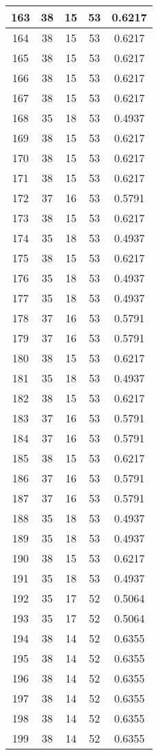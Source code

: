 \documentclass[letterpaper, 12pt]{article}
\begin{document}
\begin{longtable}{|c|c|c|c|c|}
\hline
163 & 38 & 15 & 53 & 0.6217 \\
\hline
164 & 38 & 15 & 53 & 0.6217 \\
\hline
165 & 38 & 15 & 53 & 0.6217 \\
\hline
166 & 38 & 15 & 53 & 0.6217 \\
\hline
167 & 38 & 15 & 53 & 0.6217 \\
\hline
168 & 35 & 18 & 53 & 0.4937 \\
\hline
169 & 38 & 15 & 53 & 0.6217 \\
\hline
170 & 38 & 15 & 53 & 0.6217 \\
\hline
171 & 38 & 15 & 53 & 0.6217 \\
\hline
172 & 37 & 16 & 53 & 0.5791 \\
\hline
173 & 38 & 15 & 53 & 0.6217 \\
\hline
174 & 35 & 18 & 53 & 0.4937 \\
\hline
175 & 38 & 15 & 53 & 0.6217 \\
\hline
176 & 35 & 18 & 53 & 0.4937 \\
\hline
177 & 35 & 18 & 53 & 0.4937 \\
\hline
178 & 37 & 16 & 53 & 0.5791 \\
\hline
179 & 37 & 16 & 53 & 0.5791 \\
\hline
180 & 38 & 15 & 53 & 0.6217 \\
\hline
181 & 35 & 18 & 53 & 0.4937 \\
\hline
182 & 38 & 15 & 53 & 0.6217 \\
\hline
183 & 37 & 16 & 53 & 0.5791 \\
\hline
184 & 37 & 16 & 53 & 0.5791 \\
\hline
185 & 38 & 15 & 53 & 0.6217 \\
\hline
186 & 37 & 16 & 53 & 0.5791 \\
\hline
187 & 37 & 16 & 53 & 0.5791 \\
\hline
188 & 35 & 18 & 53 & 0.4937 \\
\hline
189 & 35 & 18 & 53 & 0.4937 \\
\hline
190 & 38 & 15 & 53 & 0.6217 \\
\hline
191 & 35 & 18 & 53 & 0.4937 \\
\hline
192 & 35 & 17 & 52 & 0.5064 \\
\hline
193 & 35 & 17 & 52 & 0.5064 \\
\hline
194 & 38 & 14 & 52 & 0.6355 \\
\hline
195 & 38 & 14 & 52 & 0.6355 \\
\hline
196 & 38 & 14 & 52 & 0.6355 \\
\hline
197 & 38 & 14 & 52 & 0.6355 \\
\hline
198 & 38 & 14 & 52 & 0.6355 \\
\hline
199 & 38 & 14 & 52 & 0.6355 \\
\hline
\end{longtable}
\end{document}
